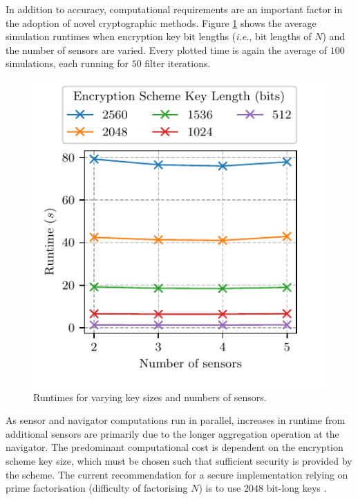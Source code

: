 \documentclass[10pt,letterpaper,oneside,twocolumn,journal]{IEEEtran}
\theoremstyle{definition}
\theoremstyle{definition}
\theoremstyle{remark}
\begin{document}
In addition to accuracy, computational requirements are an important factor in the adoption of novel cryptographic methods. Figure \ref{fig:sim_timing} shows the average simulation runtimes when encryption key bit lengths (\textit{i.e.}, bit lengths of $N$) and the number of sensors are varied. Every plotted time is again the average of $100$ simulations, each running for $50$ filter iterations. 
\begin{figure}[htbp]
\centering
\includegraphics{images/timing.pdf}
\vspace{-\baselineskip}
\caption{Runtimes for varying key sizes and numbers of sensors.}
\vspace{-\baselineskip}
\label{fig:sim_timing}
\end{figure}
As sensor and navigator computations run in parallel, increases in runtime from additional sensors are primarily due to the longer aggregation operation at the navigator. The predominant computational cost is dependent on the encryption scheme key size, which must be chosen such that sufficient security is provided by the scheme. The current recommendation for a secure implementation relying on prime factorisation (difficulty of factorising $N$) is to use $2048$ bit-long keys \cite{barkerRecommendationPairwiseKey2019}.

% 
%                                               
%                                               
%                                               
% 
\end{document}
